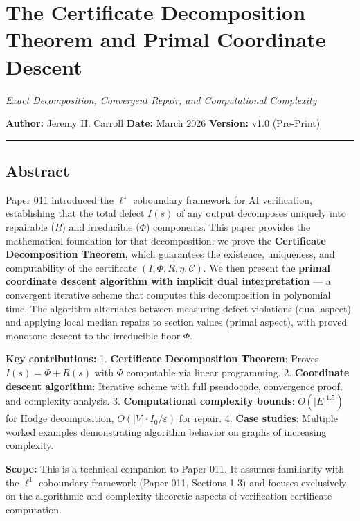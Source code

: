 \documentclass[
]{article}
\author{}
\date{}
\begin{document}
\section{The Certificate Decomposition Theorem and Primal Coordinate
Descent}\label{the-certificate-decomposition-theorem-and-primal-coordinate-descent}

\emph{Exact Decomposition, Convergent Repair, and Computational
Complexity}

\textbf{Author:} Jeremy H. Carroll \textbf{Date:} March 2026
\textbf{Version:} v1.0 (Pre-Print)

\begin{center}\rule{0.5\linewidth}{0.5pt}\end{center}

\subsection{Abstract}\label{abstract}

Paper 011 introduced the \(\ell^1\) coboundary framework for AI
verification, establishing that the total defect \(I(s)\) of any output
decomposes uniquely into repairable (\(R\)) and irreducible (\(\Phi\))
components. This paper provides the mathematical foundation for that
decomposition: we prove the \textbf{Certificate Decomposition Theorem},
which guarantees the existence, uniqueness, and computability of the
certificate \((I, \Phi, R, \eta, \mathcal{C})\). We then present the
\textbf{primal coordinate descent algorithm with implicit dual
interpretation} --- a convergent iterative scheme that computes this
decomposition in polynomial time. The algorithm alternates between
measuring defect violations (dual aspect) and applying local median
repairs to section values (primal aspect), with proved monotone descent
to the irreducible floor \(\Phi\).

\textbf{Key contributions:} 1. \textbf{Certificate Decomposition
Theorem}: Proves \(I(s) = \Phi + R(s)\) with \(\Phi\) computable via
linear programming. 2. \textbf{Coordinate descent algorithm}: Iterative
scheme with full pseudocode, convergence proof, and complexity analysis.
3. \textbf{Computational complexity bounds}: \(O(|E|^{1.5})\) for Hodge
decomposition, \(O(|V| \cdot I_0 / \varepsilon)\) for repair. 4.
\textbf{Case studies}: Multiple worked examples demonstrating algorithm
behavior on graphs of increasing complexity.

\textbf{Scope:} This is a technical companion to Paper 011. It assumes
familiarity with the \(\ell^1\) coboundary framework (Paper 011,
Sections 1-3) and focuses exclusively on the algorithmic and
complexity-theoretic aspects of verification certificate computation.
\end{document}
